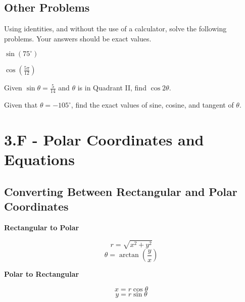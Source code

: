 \documentclass{exam}
\begin{document}
\subsection*{Other Problems}
Using identities, and without the use of a calculator, solve the following problems. Your answers should be exact values.
\begin{questions}
    \question $\sin(75^\circ)$


    \question $\displaystyle\cos\left(\frac{5\pi}{12}\right)$


    \question Given $\displaystyle\sin\theta=\frac{5}{14}$ and $\theta$ is in Quadrant II, find $\cos2\theta$.


    \question Given that $\theta=-105^\circ$, find the exact values of sine, cosine, and tangent of $\theta$.

\end{questions}

\newpage

\section*{3.F - Polar Coordinates and Equations}\label{sec:polar-coordinates}
\subsection*{Converting Between Rectangular and Polar Coordinates}
\begin{tcolorbox}[title=Recall: \textit{Converting Between Rectangular and Polar Coordinates},title filled,colframe=black,sharpish corners,width=\linewidth]
    \begin{minipage}[t]{.45\linewidth}

        \begin{center}
            \textbf{Rectangular to Polar}
        \end{center}
        \[r=\sqrt{x^2+y^2}\]
        \[\theta=\arctan\left(\frac{y}{x}\right)\]
    \end{minipage}
    \hfil
    \begin{minipage}[t]{.45\linewidth}
        \begin{center}
            \textbf{Polar to Rectangular}
        \end{center}
        \[x=r\cos\theta\]
        \[y=r\sin\theta\]
    \end{minipage}

\end{tcolorbox}
\end{document}
